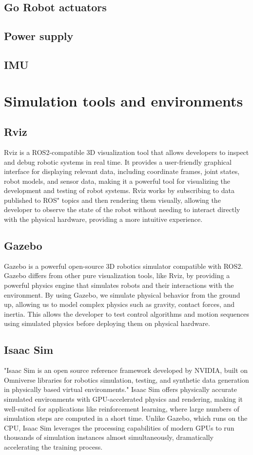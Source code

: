\subsection{Go Robot actuators}
\subsection{Power supply}
\subsection{IMU}

\section{Simulation tools and environments}
\subsection{Rviz}
Rviz is a ROS2-compatible 3D visualization tool that allows developers to inspect and debug robotic systems in real time. It provides a user-friendly graphical interface for displaying relevant data, including coordinate frames, joint states, robot models, and sensor data, making it a powerful tool for visualizing the development and testing of robot systems. Rviz works by subscribing to data published to ROS" topics and then rendering them visually, allowing the developer to observe the state of the robot without needing to interact directly with the physical hardware, providing a more intuitive experience.
\subsection{Gazebo}
Gazebo is a powerful open-source 3D robotics simulator compatible with ROS2. Gazebo differs from other pure visualization tools, like Rviz, by providing a powerful physics engine that simulates robots and their interactions with the environment. By using Gazebo, we simulate physical behavior from the ground up, allowing us to model complex physics such as gravity, contact forces, and inertia. This allows the developer to test control algorithms and motion sequences using simulated physics before deploying them on physical hardware.
\subsection{Isaac Sim}
"Isaac Sim is an open source reference framework developed by NVIDIA, built on Omniverse libraries for robotics simulation, testing, and synthetic data generation in physically based virtual environments." Isaac Sim offers physically accurate simulated environments with GPU-accelerated physics and rendering, making it well-suited for applications like reinforcement learning, where large numbers of simulation steps are computed in a short time. Unlike Gazebo, which runs on the CPU, Isaac Sim leverages the
processing capabilities of modern GPUs to run thousands of simulation instances almost simultaneously, dramatically accelerating the training process.



